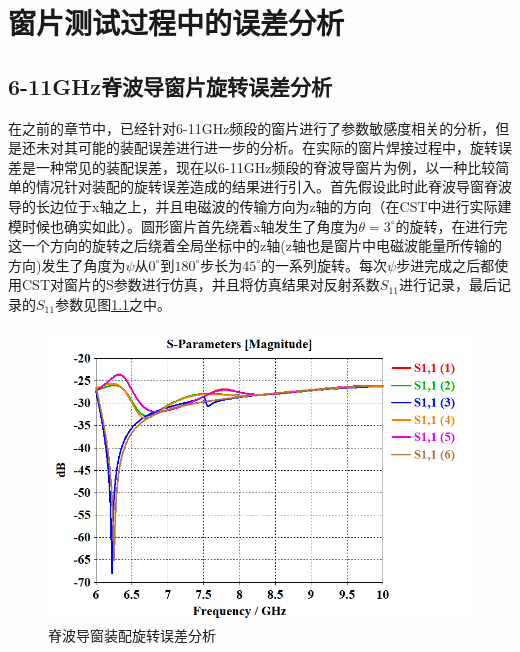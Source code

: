 \documentclass[master]{thesis-uestc}
\begin{document}
\chapter{窗片测试过程中的误差分析}
\section{6-11GHz脊波导窗片旋转误差分析}\label{sec:6-11GHz脊波导窗片旋转误差分析}
在之前的章节中，已经针对6-11GHz频段的窗片进行了参数敏感度相关的分析，但是还未对其可能的装配误差进行进一步的分析。在实际的窗片焊接过程中，旋转误差是一种常见的装配误差，现在以6-11GHz频段的脊波导窗片为例，以一种比较简单的情况针对装配的旋转误差造成的结果进行引入。首先假设此时此脊波导窗脊波导的长边位于x轴之上，并且电磁波的传输方向为z轴的方向（在CST中进行实际建模时候也确实如此）。圆形窗片首先绕着x轴发生了角度为$\theta=3^ \circ $的旋转，在进行完这一个方向的旋转之后绕着全局坐标中的z轴(z轴也是窗片中电磁波能量所传输的方向)发生了角度为$\psi$从$0^ \circ$到$180^ \circ$步长为$45^ \circ$的一系列旋转。每次$\psi $步进完成之后都使用CST对窗片的S参数进行仿真，并且将仿真结果对反射系数$S_{11}$进行记录，最后记录的$S_{11}$参数见图\ref{fig:脊波导圆窗旋转}之中。
\begin{figure}[!htb]
    \centering
    \includegraphics[width=0.5\linewidth]{pic/chapter5/脊波导圆窗旋转.png}
    \caption{脊波导窗装配旋转误差分析}
    \label{fig:脊波导圆窗旋转}
\end{figure}
\end{document}
